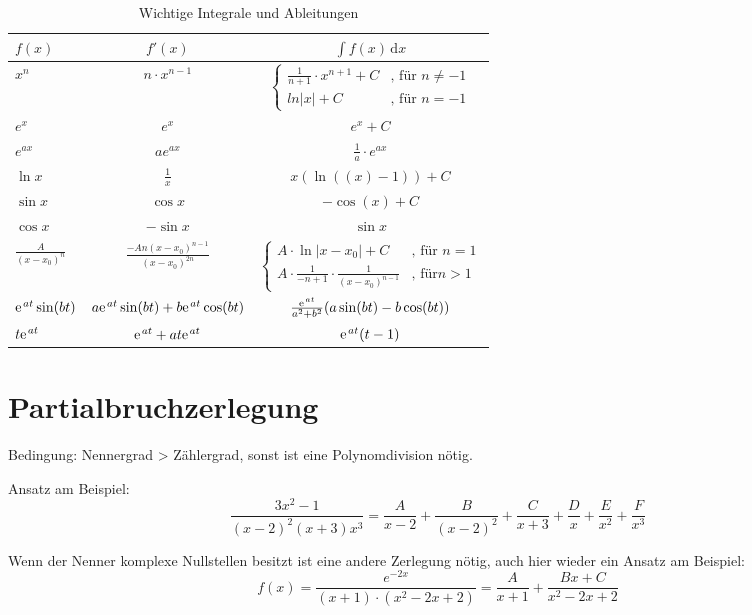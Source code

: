 \begin{table}[!ht]
\centering
\begin{tabular}{l | c | c}
	$f(x)$ & $f'(x)$ & $\int f(x)\, \mathrm{d}x$ 	\\ 
	\toprule
	$x^n$ & $n \cdot x^{n-1}$ & $\begin{cases} \frac{1}{n+1} \cdot x^{n+1} + C  & \text{, für } n\neq -1 \\ ln|x| + C  &  \text{, für }n=-1 \end{cases}$ \\
	\midrule
	$e^x$ & $e^x$ & $e^x + C$ \\
	\midrule
	$e^{ax}$ &  $ae^{ax}$ & $\frac1a \cdot e^{ax}$ \\
	\midrule
	$\ln x$	& $\frac1x$ & $x(\ln((x)-1)) + C$ \\
	\midrule
	$\sin x$ & $\cos x$ & $-\cos(x) +C $\\
	\midrule
	$\cos x$ & $-\sin x$ & $\sin x$ \\
	\midrule
	$\frac{A}{(x-x_0)^n}$ & $\frac{-An(x-x_0)^{n-1}}{(x-x_0)^{2n}}$ &  $\begin{cases} A \cdot \ln |x-x_0| + C  &  \text{, für }n=1 \\ A \cdot \frac{1}{-n+1} \cdot \frac{1}{(x-x_0)^{n-1}}  & \text{, für}n>1	\end{cases} $\\
	\midrule
	$\e^{at}\sin(bt)$ & $a\e^{at}\sin(bt)+b\e^{at}\cos(bt)$ & $\frac{\e^{at}}{a^2+b^2}(a\sin(bt)-b\cos(bt))$\\
	\midrule
	$t\e^{at}$ & $\e^{at}+at\e^{at}$ & $\e^{at}(t-1)$
\end{tabular}
\caption{Wichtige Integrale und Ableitungen}
\end{table}

\section{Partialbruchzerlegung}
Bedingung: Nennergrad > Zählergrad, sonst ist eine Polynomdivision nötig.

Ansatz am Beispiel:
\begin{equation}
	\frac{3x^2-1}{(x-2)^2(x+3)x^3} = \frac{A}{x-2} + \frac{B}{(x-2)^2} + \frac{C}{x+3} + \frac{D}{x} + \frac{E}{x^2} + \frac{F}{x^3}
\end{equation}

Wenn der Nenner komplexe Nullstellen besitzt ist eine andere Zerlegung nötig, auch hier wieder ein Ansatz am Beispiel:
\begin{equation}
	f(x)=\frac{e^{-2x}}{(x+1)\cdot(x^2-2x+2)}=\frac{A}{x+1}+\frac{Bx+C}{x^2-2x+2}
\end{equation}

